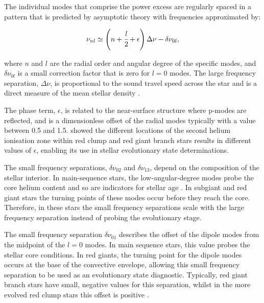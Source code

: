 The individual modes that comprise the power excess are regularly spaced in a pattern that is predicted by asymptotic theory \citep{tassoul_asymptotic_1980, gough_solar_1986} with frequencies approximated by:

\begin{equation}
    \nu_{nl} \simeq \left(n +\cfrac{l}{2} + \epsilon \right)\Delta\nu - \delta\nu_{0l},
    \label{eqtn:modes}
\end{equation}

\noindent where $n$ and $l$ are the radial order and angular degree of the specific modes, and $\delta\nu_{0l}$ is a small correction factor that is zero for $l = 0$ modes. The large frequency separation, $\Delta\nu$, is proportional to the sound travel speed across the star and is a direct measure of the mean stellar density \citep{ulrich_determination_1986}.

The phase term, $\epsilon$, is related to the near-surface structure where p-modes are reflected, and is a dimensionless offset of the radial modes typically with a value between 0.5 and 1.5. \cite{christensen-dalsgaard_asymptotic_2014} showed the different locations of the second helium ionisation zone within red clump and red giant branch stars results in different values of $\epsilon$, enabling its use in stellar evolutionary state determinations.

The small frequency separations, $\delta\nu_{02}$ and $\delta\nu_{13}$, depend on the composition of the stellar interior. In main-sequence stars, the low-angular-degree modes probe the core helium content and so are indicators for stellar age \citep{christensen-dalsgaard_introductory_1984, ulrich_determination_1986, christensen-dalsgaard_overview_1988}. In subgiant and red giant stars the turning points of these modes occur before they reach the core. Therefore, in these stars the small frequency separations scale with the large frequency separation instead of probing the evolutionary stage.

The small frequency separation $\delta\nu_{01}$ describes the offset of the dipole modes from the midpoint of the $l = 0$ modes. In main sequence stars, this value probes the stellar core conditions. In red giants, the turning point for the dipole modes occurs at the base of the convective envelope, allowing this small frequency separation to be used as an evolutionary state diagnostic. Typically, red giant branch stars have small, negative values for this separation, whilst in the more evolved red clump stars this offset is positive \citep{montalban_seismic_2010}.

